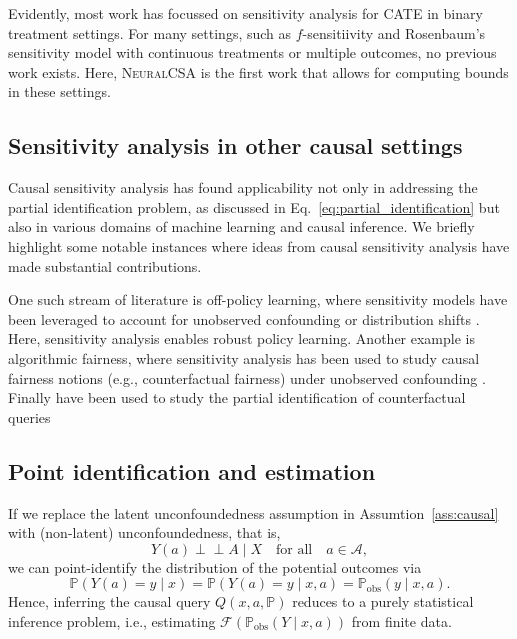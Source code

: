 \documentclass{article} %
\newcommand{\indep}{\perp \!\!\! \perp}
\newcommand{\frameworkname}{\textsc{NeuralCSA}\xspace}
\theoremstyle{definition}
\theoremstyle{plain}
\begin{document}
Evidently, most work has focussed on sensitivity analysis for CATE in binary treatment settings. For many settings, such as $f$-sensitiivity and Rosenbaum's sensitivity model with continuous treatments or multiple outcomes, no previous work exists. Here, \frameworkname is the first work that allows for computing bounds in these settings.

\subsection{Sensitivity analysis in other causal settings}

Causal sensitivity analysis has found applicability not only in addressing the partial identification problem, as discussed in Eq.~\eqref{eq:partial_identification} but also in various domains of machine learning and causal inference. We briefly highlight some notable instances where ideas from causal sensitivity analysis have made substantial contributions.

One such stream of literature is off-policy learning, where sensitivity models have been leveraged to account for unobserved confounding or distribution shifts \citep{Kallus.2018c, Hatt.2022b}. Here, sensitivity analysis enables robust policy learning. Another example is algorithmic fairness, where sensitivity analysis has been used to study causal fairness notions (e.g., counterfactual fairness) under unobserved confounding \citep{Kilbertus.2019}. Finally have been used to study the partial identification of counterfactual queries \citep{Melnychuk.2023b}


\subsection{Point identification and estimation}

If we replace the latent unconfoundedness assumption in Assumtion~\ref{ass:causal} with (non-latent) unconfoundedness, that is,
\begin{equation}
    Y(a) \indep A \mid X \quad \text{for all} \quad a \in \mathcal{A},
\end{equation}
we can point-identify the distribution of the potential outcomes via
\begin{equation}
    \mathbb{P}(Y(a) = y \mid x) = \mathbb{P}(Y(a) = y \mid x, a)  = \mathbb{P}_\mathrm{obs}(y \mid x, a).
\end{equation}
Hence, inferring the causal query $Q(x, a, \mathbb{P})$ reduces to a purely statistical inference problem, i.e., estimating $\mathcal{F}(\mathbb{P}_\mathrm{obs}(Y \mid x, a))$ from finite data.
\end{document}
